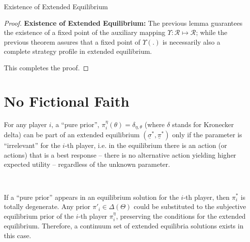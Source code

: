 \documentclass{beamer}
\theoremstyle{definition}
\begin{document}
\begin{frame}{Existence of Extended Equilibrium}

    \begin{proof}
{\bf Existence of Extended Equilibrium:}
The previous lemma guarantees the existence of a fixed point of the auxiliary mapping $\Upsilon : \mathcal{R} \mapsto \mathcal{R}$;
while the previous theorem assures that a fixed point of $\Upsilon(.)$ is necessarily also a complete strategy profile in extended equilibrium.

This completes the proof.
    
\end{proof}
    
\end{frame}

\section{No Fictional Faith}

\begin{frame}{}

\begin{theorem}
\label{thm:NoFictionalFaith}
    For any player $i$, a ``pure prior'', $\pi_i^{\eta}(\theta) = \delta_{\eta,\theta}$ (where $\delta$ stands for Kronecker delta) can be part of an extended equilibrium $(\underline{\sigma}^*, \underline{\pi}^*)$ only if the parameter is ``irrelevant'' for the $i$-th player, i.e. in the equilibrium there is an action (or actions) that is a best response -- there is no alternative action yielding higher expected utility -- regardless of the unknown parameter. 

    \
    
    If a ``pure prior'' appears in an equilibrium solution for the $i$-th player, then  $\pi_i^*$ is totally degenerate. Any prior $\pi'_i \in \Delta(\Theta)$ could be substituted to the subjective equilibrium prior of the $i$-th player $\pi_i^{\eta}$, preserving the conditions for the extended equilibrium. Therefore, a continuum set of extended equilibria solutions exists in this case.

\end{theorem}

    
\end{frame}
\end{document}
